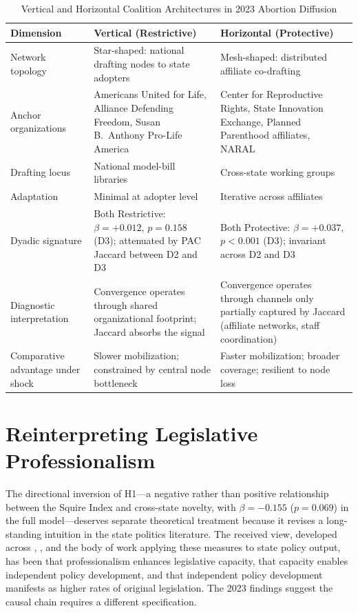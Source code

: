 \begin{table}[H]
\centering
\caption{Vertical and Horizontal Coalition Architectures in 2023 Abortion Diffusion}
\label{tab:architecture}
\renewcommand{\arraystretch}{1.4}
\setlength{\tabcolsep}{8pt}
\small
\begin{tabular}{>{\raggedright\arraybackslash}p{3.4cm} >{\raggedright\arraybackslash}p{4.6cm} >{\raggedright\arraybackslash}p{4.6cm}}
\toprule
\textbf{Dimension} & \textbf{Vertical (Restrictive)} & \textbf{Horizontal (Protective)} \\
\midrule
Network topology & Star-shaped: national drafting nodes to state adopters & Mesh-shaped: distributed affiliate co-drafting \\
\addlinespace[6pt]
Anchor organizations & Americans United for Life, Alliance Defending Freedom, Susan B.\ Anthony Pro-Life America & Center for Reproductive Rights, State Innovation Exchange, Planned Parenthood affiliates, NARAL \\
\addlinespace[6pt]
Drafting locus & National model-bill libraries & Cross-state working groups \\
\addlinespace[6pt]
Adaptation & Minimal at adopter level & Iterative across affiliates \\
\addlinespace[6pt]
Dyadic signature & Both Restrictive: $\beta = +0.012$, $p = 0.158$ (D3); attenuated by PAC Jaccard between D2 and D3 & Both Protective: $\beta = +0.037$, $p < 0.001$ (D3); invariant across D2 and D3 \\
\addlinespace[6pt]
Diagnostic interpretation & Convergence operates through shared organizational footprint; Jaccard absorbs the signal & Convergence operates through channels only partially captured by Jaccard (affiliate networks, staff coordination) \\
\addlinespace[6pt]
Comparative advantage under shock & Slower mobilization; constrained by central node bottleneck & Faster mobilization; broader coverage; resilient to node loss \\
\bottomrule
\end{tabular}
\end{table}

\section{Reinterpreting Legislative Professionalism}
\label{sec:reinterpreting-professionalism}

The directional inversion of H1---a negative rather than positive relationship between the Squire Index and cross-state novelty, with $\beta = -0.155$ ($p = 0.069$) in the full model---deserves separate theoretical treatment because it revises a long-standing intuition in the state politics literature. The received view, developed across \textcite{squireLegislativeProfessionalizationMembership1992a}, \textcite{squireMeasuringStateLegislative2007}, and the body of work applying these measures to state policy output, has been that professionalism enhances legislative capacity, that capacity enables independent policy development, and that independent policy development manifests as higher rates of original legislation. The 2023 findings suggest the causal chain requires a different specification.

